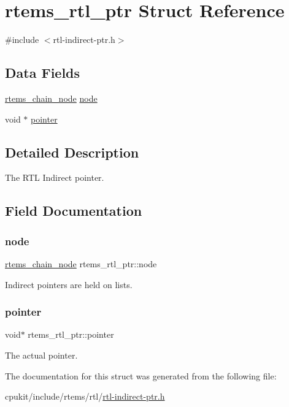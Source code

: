 \hypertarget{structrtems__rtl__ptr}{}\section{rtems\+\_\+rtl\+\_\+ptr Struct Reference}
\label{structrtems__rtl__ptr}


{\ttfamily \#include $<$rtl-\/indirect-\/ptr.\+h$>$}

\subsection*{Data Fields}
\begin{DoxyCompactItemize}
\item 
\mbox{\hyperlink{structChain__Node__struct}{rtems\+\_\+chain\+\_\+node}} \mbox{\hyperlink{structrtems__rtl__ptr_a5e79006bf021b719b6a2d9c7e7af39d6}{node}}
\item 
void $\ast$ \mbox{\hyperlink{structrtems__rtl__ptr_ad1637f9f6d10e48a2dc724593190b06d}{pointer}}
\end{DoxyCompactItemize}


\subsection{Detailed Description}
The R\+TL Indirect pointer. 

\subsection{Field Documentation}
\mbox{\label{structrtems__rtl__ptr_a5e79006bf021b719b6a2d9c7e7af39d6}} 
\subsubsection{\texorpdfstring{node}{node}}
{\footnotesize\ttfamily \mbox{\hyperlink{structChain__Node__struct}{rtems\+\_\+chain\+\_\+node}} rtems\+\_\+rtl\+\_\+ptr\+::node}

Indirect pointers are held on lists. \mbox{\label{structrtems__rtl__ptr_ad1637f9f6d10e48a2dc724593190b06d}} 
\subsubsection{\texorpdfstring{pointer}{pointer}}
{\footnotesize\ttfamily void$\ast$ rtems\+\_\+rtl\+\_\+ptr\+::pointer}

The actual pointer. 

The documentation for this struct was generated from the following file\+:\begin{DoxyCompactItemize}
\item 
cpukit/include/rtems/rtl/\mbox{\hyperlink{rtl-indirect-ptr_8h}{rtl-\/indirect-\/ptr.\+h}}\end{DoxyCompactItemize}
